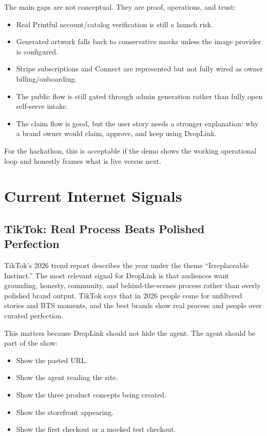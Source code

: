 \documentclass[11pt]{article}
\begin{document}
The main gaps are not conceptual. They are proof, operations, and trust:

\begin{itemize}
  \item Real Printful account/catalog verification is still a launch risk.
  \item Generated artwork falls back to conservative mocks unless the image provider is configured.
  \item Stripe subscriptions and Connect are represented but not fully wired as owner billing/onboarding.
  \item The public flow is still gated through admin generation rather than fully open self-serve intake.
  \item The claim flow is good, but the user story needs a stronger explanation: why a brand owner would claim, approve, and keep using DropLink.
\end{itemize}

For the hackathon, this is acceptable if the demo shows the working operational loop and honestly frames what is live versus next.

\section{Current Internet Signals}

\subsection{TikTok: Real Process Beats Polished Perfection}

TikTok's 2026 trend report describes the year under the theme ``Irreplaceable Instinct.'' The most relevant signal for DropLink is that audiences want grounding, honesty, community, and behind-the-scenes process rather than overly polished brand output. TikTok says that in 2026 people come for unfiltered stories and BTS moments, and the best brands show real process and people over curated perfection.

This matters because DropLink should not hide the agent. The agent should be part of the show:

\begin{itemize}
  \item Show the pasted URL.
  \item Show the agent reading the site.
  \item Show the three product concepts being created.
  \item Show the storefront appearing.
  \item Show the first checkout or a mocked test checkout.
\end{itemize}
\end{document}
